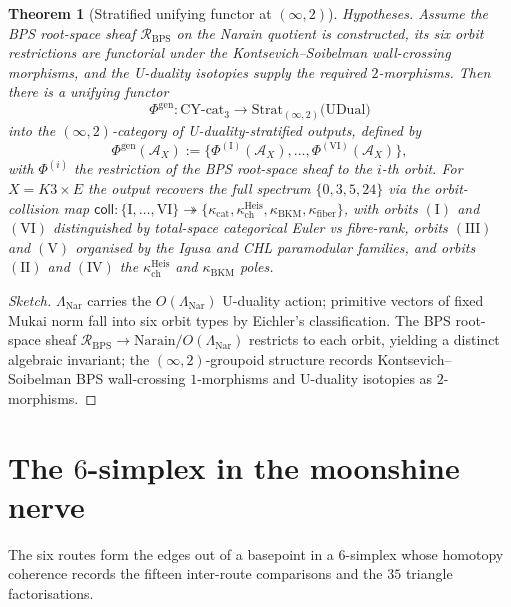 \documentclass[11pt]{article}
\newtheorem{theorem}{Theorem}[section]
\begin{document}
\begin{theorem}[Stratified unifying functor at $(\infty, 2)$]
\label{thm:stratified-unification}
\noindent\emph{Hypotheses.} Assume the BPS root-space sheaf
$\mathcal R_{\mathrm{BPS}}$ on the Narain quotient is constructed,
its six orbit restrictions are functorial under the
Kontsevich--Soibelman wall-crossing morphisms, and the U-duality
isotopies supply the required $2$-morphisms.
Then there is a unifying functor
\[
\Phi^{\mathrm{gen}} \colon \mathrm{CY\text{-}cat}_3
\longrightarrow
\mathrm{Strat}_{(\infty, 2)}\bigl(\mathrm{UDual}\bigr)
\]
into the $(\infty, 2)$-category of U-duality-stratified outputs,
defined by
\[
\Phi^{\mathrm{gen}}(\mathcal A_X) := \bigl\{
\Phi^{(\mathrm I)}(\mathcal A_X), \ldots,
\Phi^{(\mathrm{VI})}(\mathcal A_X) \bigr\},
\]
with $\Phi^{(i)}$ the restriction of the BPS root-space sheaf to the
$i$-th orbit. For $X = K3 \times E$ the output recovers the full
spectrum $\{0, 3, 5, 24\}$ via the orbit-collision map
$\mathsf{coll} \colon \{\mathrm I, \ldots, \mathrm{VI}\}
\twoheadrightarrow \{\kappa_{\mathrm{cat}},
\kappa_{\mathrm{ch}}^{\mathrm{Heis}},
\kappa_{\mathrm{BKM}}, \kappa_{\mathrm{fiber}}\}$,
with orbits $(\mathrm I)$ and $(\mathrm{VI})$ distinguished by
total-space categorical Euler vs fibre-rank, orbits $(\mathrm{III})$
and $(\mathrm V)$ organised by the Igusa and CHL paramodular
families, and orbits
$(\mathrm{II})$ and $(\mathrm{IV})$ the
$\kappa_{\mathrm{ch}}^{\mathrm{Heis}}$ and
$\kappa_{\mathrm{BKM}}$ poles.
\end{theorem}

\begin{proof}[Sketch]
$\Lambda_{\mathrm{Nar}}$ carries the $O(\Lambda_{\mathrm{Nar}})$
U-duality action; primitive vectors of fixed Mukai norm fall into
six orbit types by Eichler's classification. The BPS root-space
sheaf $\mathcal R_{\mathrm{BPS}} \to
\mathrm{Narain}/O(\Lambda_{\mathrm{Nar}})$ restricts to each orbit,
yielding a distinct algebraic invariant; the $(\infty, 2)$-groupoid
structure records Kontsevich--Soibelman BPS wall-crossing
$1$-morphisms and U-duality isotopies as $2$-morphisms.
\end{proof}

\section{The $6$-simplex in the moonshine nerve}
\label{sec:six-simplex}

The six routes form the edges out of a basepoint in a $6$-simplex
whose homotopy coherence records the
fifteen inter-route comparisons and the $35$ triangle
factorisations.
\end{document}
